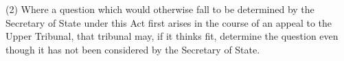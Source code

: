 \documentclass[12pt,a4paper]{article}
\begin{document}
%
%
%
%
%

(2) Where a question which would otherwise fall to be determined by 
the Secretary of State under this Act first arises in the course of an appeal to the Upper Tribunal, that tribunal may, if it thinks fit, determine the question even though it has not been considered by 
the Secretary of State.
\end{document}

